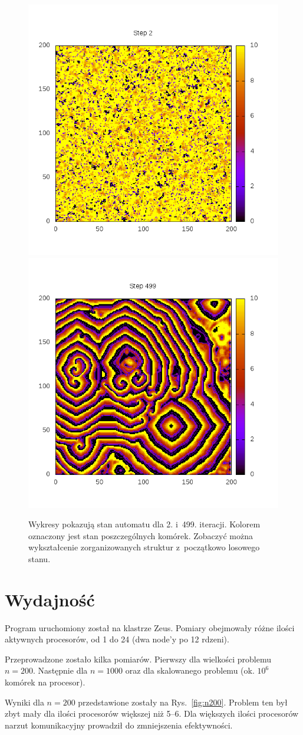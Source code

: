 \documentclass[a4paper; 12pt]{article}
\begin{document}
\begin{figure}[b!]
    \centering
    \includegraphics[width=.45\textwidth]{fig/plot_2.png}
    \hfill
    \includegraphics[width=.45\textwidth]{fig/plot_499.png}
    \caption{Wykresy pokazują stan automatu dla 2. i~499. iteracji.
             Kolorem oznaczony jest stan poszczególnych komórek.
             Zobaczyć można wykształcenie zorganizowanych struktur z~początkowo
             losowego stanu.}
    \label{fig:automat}
\end{figure}

\section{Wydajność}

Program uruchomiony został na klastrze Zeus.
Pomiary obejmowały różne ilości aktywnych procesorów, od 1 do 24 (dwa node'y po 12 rdzeni).

Przeprowadzone zostało kilka pomiarów.
Pierwszy dla wielkości problemu $n = 200$.
Następnie dla $n = 1000$ oraz dla skalowanego problemu (ok. $10^6$ komórek na procesor).

Wyniki dla $n = 200$ przedstawione zostały na Rys.~\ref{fig:n200}.
Problem ten był zbyt mały dla ilości procesorów większej niż 5--6.
Dla większych ilości procesorów narzut komunikacyjny prowadził do zmniejszenia
efektywności.
\end{document}

